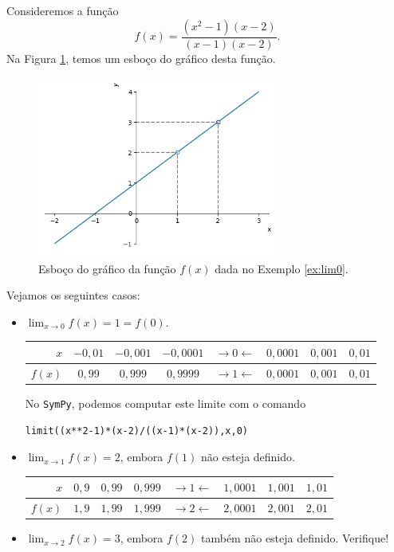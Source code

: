 \begin{ex}\label{ex:lim0}
  Consideremos a função
  \begin{equation}
    f(x) = \frac{(x^2-1)(x-2)}{(x-1)(x-2)}.
  \end{equation}
  Na Figura \ref{fig:ex_lim0}, temos um esboço do gráfico desta função.

  \begin{figure}[H]
    \centering
    \includegraphics[width=0.7\textwidth]{./cap_lim/dados/fig_ex_lim0/fig_ex_lim0}
    \caption{Esboço do gráfico da função $f(x)$ dada no Exemplo \ref{ex:lim0}.}
    \label{fig:ex_lim0}
  \end{figure}


  Vejamos os seguintes casos:
  \begin{itemize}
  \item $\displaystyle \lim_{x\to 0} f(x) = 1 = f(0)$.
    
    \begin{tabular}{r|ccc|c|ccc}
      $x$ & $-0,01$ & $-0,001$ & $-0,0001$ & $\rightarrow 0 \leftarrow$ & $0,0001$ & $0,001$ & $0,01$\\\hline
      $f(x)$ & $0,99$ & $0,999$ & $0,9999$ & $\rightarrow 1 \leftarrow$ & $0,0001$ & $0,001$ & $0,01$
    \end{tabular}

    \ifispython
    No \verb+SymPy+, podemos computar este limite com o comando
\begin{verbatim}
limit((x**2-1)*(x-2)/((x-1)*(x-2)),x,0)
\end{verbatim}
    \fi
  \item $\displaystyle \lim_{x\to 1} f(x) = 2$, embora $f(1)$ não esteja definido.
    
    \begin{tabular}{r|ccc|c|ccc}
      $x$ & $0,9$ & $0,99$ & $0,999$ & $\rightarrow 1 \leftarrow$ & $1,0001$ & $1,001$ & $1,01$\\\hline
      $f(x)$ & $1,9$ & $1,99$ & $1,999$ & $\rightarrow 2 \leftarrow$ & $2,0001$ & $2,001$ & $2,01$
    \end{tabular}
  \item $\displaystyle \lim_{x\to 2} f(x) = 3$, embora $f(2)$ também não esteja definido. Verifique!
  \end{itemize}
\end{ex}

